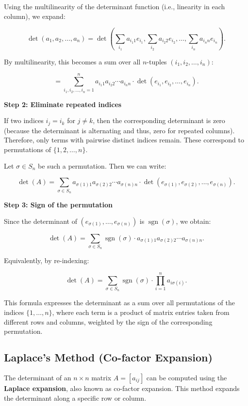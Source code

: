 Using the multilinearity of the determinant function (i.e., linearity in each column), we expand:

\[
\det(a_1, a_2, \dots, a_n) = \det\left( \sum_{i_1} a_{i_1 1} e_{i_1}, \sum_{i_2} a_{i_2 2} e_{i_2}, \dots, \sum_{i_n} a_{i_n n} e_{i_n} \right).
\]

By multilinearity, this becomes a sum over all \(n\)-tuples \( (i_1, i_2, \dots, i_n) \):

\[
= \sum_{i_1, i_2, \dots, i_n = 1}^n a_{i_1 1} a_{i_2 2} \cdots a_{i_n n} \cdot \det(e_{i_1}, e_{i_2}, \dots, e_{i_n}).
\]

\textbf{Step 2: Eliminate repeated indices}

If two indices \( i_j = i_k \) for \( j \neq k \), then the corresponding 
determinant is zero (because the determinant is alternating and thus, zero for repeated columns). 
Therefore, only terms with pairwise distinct indices remain. These correspond to permutations of \( \{1, 2, \dots, n\} \).

Let \( \sigma \in S_n \) be such a permutation. Then we can write:

\[
\det(A) = \sum_{\sigma \in S_n} a_{\sigma(1) 1} a_{\sigma(2) 2} \cdots a_{\sigma(n) n} \cdot \det(e_{\sigma(1)}, e_{\sigma(2)}, \dots, e_{\sigma(n)}).
\]

\textbf{Step 3: Sign of the permutation}

Since the determinant of \( (e_{\sigma(1)}, \dots, e_{\sigma(n)}) \) is \( \operatorname{sgn}(\sigma) \), we obtain:

\[
\det(A) = \sum_{\sigma \in S_n} \operatorname{sgn}(\sigma) \cdot a_{\sigma(1)1} a_{\sigma(2)2} \cdots a_{\sigma(n)n}.
\]

Equivalently, by re-indexing:

\[
\det(A) = \sum_{\sigma \in S_n} \operatorname{sgn}(\sigma) \cdot \prod_{i=1}^n a_{i \sigma(i)}.
\]

This formula expresses the determinant as a sum over all permutations of the indices \( \{1, \dots, n\} \), where each term is a product of matrix entries taken from different rows and columns, weighted by the sign of the corresponding permutation.

\subsection{Laplace's Method (Co-factor Expansion)}

The determinant of an \( n \times n \) matrix \( A = [a_{ij}] \) can be 
computed using the \textbf{Laplace expansion}, also known as co-factor expansion. 
This method expands the determinant along a specific row or column.

